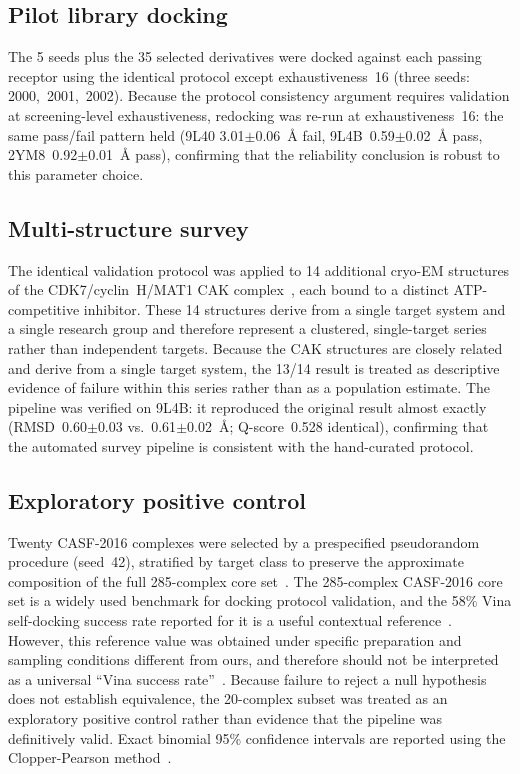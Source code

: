 \documentclass[global,twocolumn]{svjour}
\begin{document}
\subsection{Pilot library docking}

The 5 seeds plus the 35 selected derivatives were docked against each
passing receptor using the identical protocol except exhaustiveness~16 (three
seeds: 2000,~2001,~2002). Because the protocol consistency argument requires
validation at screening-level exhaustiveness, redocking was re-run at
exhaustiveness~16: the same pass/fail pattern held (9L40
3.01$\pm$0.06~\AA{} fail, 9L4B~0.59$\pm$0.02~\AA{} pass,
2YM8~0.92$\pm$0.01~\AA{} pass), confirming that the reliability conclusion
is robust to this parameter choice.

\subsection{Multi-structure survey}

The identical validation protocol was applied to 14 additional cryo-EM
structures of the CDK7/cyclin~H/MAT1 CAK complex~\cite{cushing2024}, each
bound to a distinct ATP-competitive inhibitor. These 14 structures derive
from a single target system and a single research group and therefore
represent a clustered, single-target series rather than independent targets.
Because the CAK structures are closely related and derive from a single
target system, the 13/14 result is treated as descriptive evidence of failure
within this series rather than as a population estimate. The pipeline was
verified on 9L4B: it reproduced the original result almost exactly
(RMSD~0.60$\pm$0.03 vs.~0.61$\pm$0.02~\AA{}; Q-score~0.528 identical),
confirming that the automated survey pipeline is consistent with the
hand-curated protocol.

\subsection{Exploratory positive control}

Twenty CASF-2016 complexes were selected by a prespecified pseudorandom
procedure (seed~42), stratified by target class to preserve the approximate
composition of the full 285-complex core set~\cite{zhang2023}. The 285-complex
CASF-2016 core set is a widely used benchmark for docking protocol
validation, and the 58\% Vina self-docking success rate reported for it is a
useful contextual reference~\cite{zhang2023}. However, this reference value
was obtained under specific preparation and sampling conditions different from
ours, and therefore should not be interpreted as a universal ``Vina success
rate''~\cite{zhang2023}. Because failure to reject a null hypothesis does not
establish equivalence, the 20-complex subset was treated as an exploratory
positive control rather than evidence that the pipeline was definitively
valid. Exact binomial 95\% confidence intervals are reported using the
Clopper-Pearson method~\cite{clopper1934}.
\end{document}
